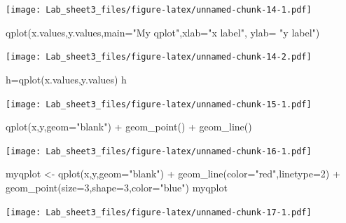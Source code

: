 \documentclass[
]{article}
\newenvironment{Shaded}{\begin{snugshade}}{\end{snugshade}}
\newcommand{\AttributeTok}[1]{\textcolor[rgb]{0.77,0.63,0.00}{#1}}
\newcommand{\DecValTok}[1]{\textcolor[rgb]{0.00,0.00,0.81}{#1}}
\newcommand{\FunctionTok}[1]{\textcolor[rgb]{0.00,0.00,0.00}{#1}}
\newcommand{\NormalTok}[1]{#1}
\newcommand{\OtherTok}[1]{\textcolor[rgb]{0.56,0.35,0.01}{#1}}
\newcommand{\SpecialCharTok}[1]{\textcolor[rgb]{0.00,0.00,0.00}{#1}}
\newcommand{\StringTok}[1]{\textcolor[rgb]{0.31,0.60,0.02}{#1}}
\theoremstyle{remark}
\begin{document}
\texttt{[image: Lab\_sheet3\_files/figure-latex/unnamed-chunk-14-1.pdf]}

\begin{Shaded}
\begin{Highlighting}[]
\FunctionTok{qplot}\NormalTok{(x.values,y.values,}\AttributeTok{main=}\StringTok{"My qplot"}\NormalTok{,}\AttributeTok{xlab=}\StringTok{"x label"}\NormalTok{,}
\AttributeTok{ylab=} \StringTok{"y label"}\NormalTok{)}
\end{Highlighting}
\end{Shaded}

\texttt{[image: Lab\_sheet3\_files/figure-latex/unnamed-chunk-14-2.pdf]}

\begin{Shaded}
\begin{Highlighting}[]
\NormalTok{h}\OtherTok{=}\FunctionTok{qplot}\NormalTok{(x.values,y.values)}
\NormalTok{h}
\end{Highlighting}
\end{Shaded}

\texttt{[image: Lab\_sheet3\_files/figure-latex/unnamed-chunk-15-1.pdf]}

\begin{Shaded}
\begin{Highlighting}[]
\FunctionTok{qplot}\NormalTok{(x,y,}\AttributeTok{geom=}\StringTok{"blank"}\NormalTok{) }\SpecialCharTok{+} \FunctionTok{geom\_point}\NormalTok{() }\SpecialCharTok{+} \FunctionTok{geom\_line}\NormalTok{()}
\end{Highlighting}
\end{Shaded}

\texttt{[image: Lab\_sheet3\_files/figure-latex/unnamed-chunk-16-1.pdf]}

\begin{Shaded}
\begin{Highlighting}[]
\NormalTok{myqplot }\OtherTok{\textless{}{-}} \FunctionTok{qplot}\NormalTok{(x,y,}\AttributeTok{geom=}\StringTok{"blank"}\NormalTok{) }\SpecialCharTok{+} \FunctionTok{geom\_line}\NormalTok{(}\AttributeTok{color=}\StringTok{"red"}\NormalTok{,}\AttributeTok{linetype=}\DecValTok{2}\NormalTok{) }\SpecialCharTok{+}
\FunctionTok{geom\_point}\NormalTok{(}\AttributeTok{size=}\DecValTok{3}\NormalTok{,}\AttributeTok{shape=}\DecValTok{3}\NormalTok{,}\AttributeTok{color=}\StringTok{"blue"}\NormalTok{)}
\NormalTok{myqplot}
\end{Highlighting}
\end{Shaded}

\texttt{[image: Lab\_sheet3\_files/figure-latex/unnamed-chunk-17-1.pdf]}
\end{document}
